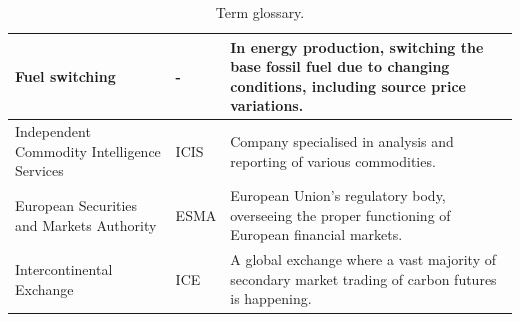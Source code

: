 \documentclass[12pt, letterpaper]{article}
\begin{document}
\begin{table}[H]
{\begin{tabularx}{\textwidth}{|X|l|X|}
\hline
Fuel switching & - & In energy production, switching the base fossil fuel due to changing conditions, including source price variations. \\
\hline
Independent Commodity Intelligence Services & ICIS & Company specialised in analysis and reporting of various commodities. \\
\hline
European Securities and Markets Authority & ESMA & European Union’s regulatory body, overseeing the proper functioning of European financial markets. \\
\hline
Intercontinental Exchange & ICE & A global exchange where a vast majority of secondary market trading of carbon futures is happening. \\
\hline
\end{tabularx}
}
\caption{Term glossary.}
\label{tab:termglossary}
\end{table}
\end{document}
